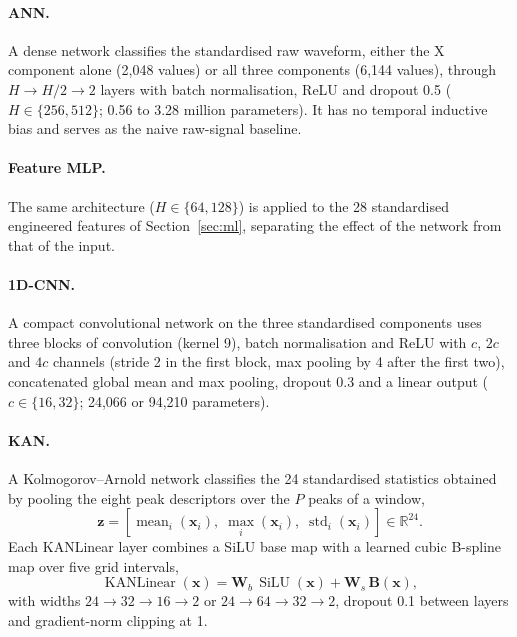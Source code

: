 \documentclass[a4paper,fleqn]{cas-dc}
\begin{document}
\paragraph{ANN.} A dense network classifies the standardised raw waveform, either the X
component alone (2,048 values) or all three components (6,144 values), through
$H\rightarrow H/2\rightarrow2$ layers with batch normalisation, ReLU and dropout 0.5
($H\in\{256,512\}$; 0.56 to 3.28 million parameters). It has no temporal inductive bias
and serves as the naive raw-signal baseline.

\paragraph{Feature MLP.} The same architecture ($H\in\{64,128\}$) is applied to the 28
standardised engineered features of Section~\ref{sec:ml}, separating the effect of the
network from that of the input.

\paragraph{1D-CNN.} A compact convolutional network on the three standardised components
uses three blocks of convolution (kernel 9), batch normalisation and ReLU with $c$, $2c$
and $4c$ channels (stride 2 in the first block, max pooling by 4 after the first two),
concatenated global mean and max pooling, dropout 0.3 and a linear output
($c\in\{16,32\}$; 24,066 or 94,210 parameters).

\paragraph{KAN.} A Kolmogorov--Arnold network \citep{liu2024kan} classifies the 24
standardised statistics obtained by pooling the eight peak descriptors over the $P$
peaks of a window,
\begin{equation}
\mathbf{z}=\left[\operatorname{mean}_{i}(\mathbf{x}_i),\;
\operatorname{max}_{i}(\mathbf{x}_i),\;
\operatorname{std}_{i}(\mathbf{x}_i)\right]\in\mathbb{R}^{24}.
\end{equation}
Each KANLinear layer combines a SiLU base map with a learned cubic B-spline map over five
grid intervals,
\begin{equation}
\operatorname{KANLinear}(\mathbf{x})=
\mathbf{W}_{b}\,\operatorname{SiLU}(\mathbf{x})+
\mathbf{W}_{s}\,\mathbf{B}(\mathbf{x}),
\end{equation}
with widths $24\rightarrow32\rightarrow16\rightarrow2$ or
$24\rightarrow64\rightarrow32\rightarrow2$, dropout 0.1 between layers and gradient-norm
clipping at 1.
\end{document}
